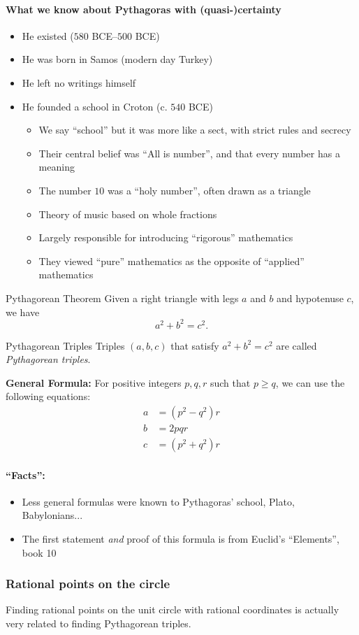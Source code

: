\documentclass[class=article, crop=false]{standalone}
\begin{document}
  \paragraph{What we know about Pythagoras with (quasi-)certainty}
  \begin{itemize}
    \item He existed (\tilde $580$ BCE--$500$ BCE)
    \item He was born in Samos (modern day Turkey)
    \item He left no writings himself
    \item He founded a school in Croton (c. $540$ BCE)
    \begin{itemize}
      \item We say ``school'' but it was more like a sect, with strict rules and secrecy
      \item Their central belief was ``All is number'', and that every number has a meaning
      \item The number $10$ was a ``holy number'', often drawn as a triangle
      \item Theory of music based on whole fractions
      \item Largely responsible for introducing ``rigorous'' mathematics
      \item They viewed ``pure'' mathematics as the opposite of ``applied'' mathematics
    \end{itemize}
  \end{itemize}
  \begin{theorem}{Pythagorean Theorem}
    Given a right triangle with legs $a$ and $b$ and hypotenuse $c$, we have
    \[
      a^2 + b^2 = c^2.
    \]
  \end{theorem}
  \begin{definition}{Pythagorean Triples}
    Triples $(a, b, c)$ that satisfy $a^2 + b^2 = c^2$ are called \emph{Pythagorean triples}.
  \end{definition}
  \textbf{General Formula:} For positive integers $p, q, r$ such that $p\geq q$, we can use the following equations:
  \begin{align*}
    a &= (p^2 - q^2)r \\
    b &= 2pqr \\
    c &= (p^2 + q^2)r
  \end{align*}
  \paragraph{``Facts'':}
  \begin{itemize}
    \item Less general formulas were known to Pythagoras' school, Plato, Babylonians...
    \item The first statement \emph{and} proof of this formula is from Euclid's ``Elements'', book 10
  \end{itemize}
  \subsubsection{Rational points on the circle}
  Finding rational points on the unit circle with rational coordinates is actually very related to finding Pythagorean triples.
\end{document}
